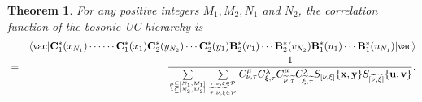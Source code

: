 \documentclass[11pt,reqno]{amsart}
\numberwithin{equation}{section}
\newtheorem{theorem}{Theorem}[section]
\begin{document}
\begin{theorem}
For any positive integers $M_{1},M_{2},N_{1}$ and $N_{2}$, the correlation function of the bosonic UC hierarchy is
\begin{eqnarray}
&&\langle\text{vac}|\mathbf{C}^{\ast}_{1}(x_{N_{1}})
\cdots\cdots\mathbf{C}^{\ast}_{1}(x_{1})\mathbf{C}^{\ast}_{2}(y_{N_{2}})
\cdots\mathbf{C}^{\ast}_{2}(y_{1})\mathbf{B}^{\ast}_{2}(v_{1})\cdots
\mathbf{B}^{\ast}_{2}(v_{N_{2}})\mathbf{B}^{\ast}_{1}(u_{1})
\cdots\mathbf{B}^{\ast}_{1}(u_{N_{1}})|\text{vac}\rangle\notag\\
&=&\frac{1}{\sum\limits_{\mu\subseteq[N_{1},M_{1}]\atop{\lambda\subseteq[N_{2},M_{2}]}}
\sum\limits_{\tau,\nu,\xi\in\mathcal{P}\atop{\widetilde{\tau},\widetilde{\nu},
\widetilde{\xi}\in\mathcal{P}}}
C^{\mu}_{\nu,\tau}C^{\lambda}_{\xi,\tau}C^{\mu}_{\widetilde{\nu},\widetilde{\tau}}
C^{\lambda}_{\widetilde{\xi},\widetilde{\tau}}
S_{[\nu,\xi]}\{\mathbf{x},\mathbf{y}\}
S_{[\widetilde{\nu},\widetilde{\xi}]}\{\mathbf{u},\mathbf{v}\}}.
\end{eqnarray}
\end{theorem}
\end{document}

